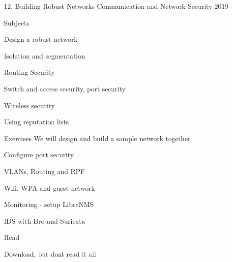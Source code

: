 \documentclass[Screen16to9,17pt]{foils}
\begin{document}
\mytitlepage
{12. Building Robust Networks}
{Communication and Network Security 2019}



\begin{list1}
\item Subjects
\begin{list2}
\item Design a robust network
\item Isolation and segmentation
\item Routing Security
\item Switch and access security, port security
\item Wireless security
\item Using reputation lists
\end{list2}
\item Exercises We will design and build a sample network together
\begin{list2}
\item Configure port security
\item VLANs, Routing and RPF
\item Wifi, WPA and guest network
\item Monitoring - setup LibreNMS
\item IDS with Bro and Suricata
\end{list2}
\end{list1}



\begin{list2}
\item Read
\item {\small {}}
\item {\small {}}
\item Download, but dont read it all\\{\small {}}
\end{list2}





\end{document}
